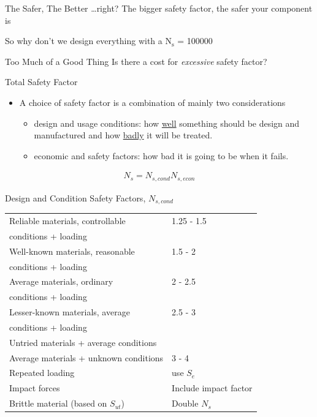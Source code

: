 \documentclass[10pt, svgnames]{beamer}
\begin{document}
\begin{frame}[label={sec:org6cf90de}]{The Safer, The Better \ldots right?}
The bigger safety factor, the safer your component is

So why don't we design everything with a N\(_{\text{s}}\) = 100000
\end{frame}

\begin{frame}[label={sec:org936e18a}]{Too Much of a Good Thing}
Is there a cost for \emph{excessive} safety factor?
\end{frame}

\begin{frame}[label={sec:org9832b0d}]{Total Safety Factor}
\begin{itemize}
\item A choice of safety factor is a combination of mainly two considerations

\begin{itemize}
\item design and usage conditions: how \underline{well} something should be design and manufactured and how \underline{badly} it will be treated.
\item economic and safety factors: how bad it is going to be when it fails.
\end{itemize}
\end{itemize}



\begin{align*}
 N_s = N_{s, cond} N_{s, econ}
\end{align*}
\end{frame}

\begin{frame}[label={sec:org76e030d}]{Design and Condition Safety Factors, \(N_{s,cond}\)}
\begin{center}
  \small
  \begin{tabular}{ll}
    \toprule
    Reliable materials, controllable & 1.25 - 1.5\\
    conditions + loading & \\
    \midrule
    Well-known materials, reasonable & 1.5 - 2\\
    conditions + loading & \\
    \midrule
    Average materials, ordinary & 2 - 2.5\\
    conditions + loading & \\
    \midrule
    Lesser-known materials, average & 2.5 - 3\\
    conditions + loading & \\
    \midrule
    Untried materials + average conditions & \\
    Average materials + unknown conditions & 3 - 4\\
    \midrule
    Repeated loading & use \(S_e\)\\
    \midrule
    Impact forces & Include impact factor\\
    \midrule
    Brittle material (based on \(S_{ut}\)) & Double \(N_s\)\\
    \bottomrule
  \end{tabular}
\end{center}
\end{frame}
\end{document}
